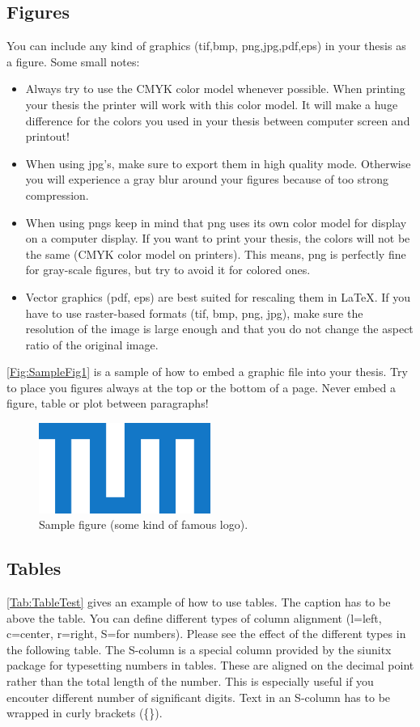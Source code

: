 \subsection{Figures}
You can include any kind of graphics (tif,bmp, png,jpg,pdf,eps) in your thesis as a figure. Some small notes:
\begin{itemize}
	\item Always try to use the CMYK color model whenever possible. When printing your thesis the printer will work with this color model. It will make a huge difference for the colors you used in your thesis between computer screen and printout!
	\item When using jpg's, make sure to export them in high quality mode. Otherwise you will experience a gray blur around your figures because of too strong compression.
	\item When using pngs keep in mind that png uses its own color model for display on a computer display. If you want to print your thesis, the colors will not be the same (CMYK color model on printers). This means, png is perfectly fine for gray-scale figures, but try to avoid it for colored ones.
	\item Vector graphics (pdf, eps) are best suited for rescaling them in \LaTeX. If you have to use raster-based formats (tif, bmp, png, jpg), make sure the resolution of the image is large enough and that you do not change the aspect ratio of the original image.
\end{itemize}

\autoref{Fig:SampleFig1} is a sample of how to embed a graphic file into your thesis. Try to place you figures always at the top or the bottom of a page. Never embed a figure, table or plot between paragraphs!

\begin{figure}
	\centering
	\includegraphics[width=0.5\textwidth]{Figures/TUM_Logo_cmyk.pdf}
	\caption{Sample figure (some kind of famous logo).}
	\label{Fig:SampleFig1}
\end{figure}
\newpage

\subsection{Tables}
\autoref{Tab:TableTest} gives an example of how to use tables. The caption has to be above the table. You can define different types of column alignment (l=left, c=center, r=right, S=for numbers). Please see the effect of the different types in the following table. The S-column is a special column provided by the siunitx package for typesetting numbers in tables. These are aligned on the decimal point rather than the total length of the number. This is especially useful if you encouter different number of significant digits. Text in an S-column has to be wrapped in curly brackets (\{\}).

